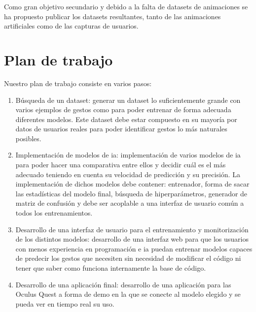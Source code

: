 Como gran objetivo secundario y debido a la falta de datasets de animaciones se ha propuesto publicar los datasets resultantes, tanto de las animaciones artificiales como de las capturas de usuarios.



\section{Plan de trabajo}
Nuestro plan de trabajo consiste en varios pasos:
\begin{enumerate}
	\item Búsqueda de un dataset: generar un dataset lo suficientemente grande con varios ejemplos de gestos como para poder entrenar de forma adecuada diferentes modelos. Este dataset debe estar compuesto en su mayoría por datos de usuarios reales para poder identificar gestos lo más naturales posibles.
	\item Implementación de modelos de \gls{ia}: implementación de varios modelos de \gls{ia} para poder hacer una comparativa entre ellos y decidir cuál es el más adecuado teniendo en cuenta su velocidad de predicción y su precisión. La implementación de dichos modelos debe contener: entrenador, forma de sacar las estadísticas del modelo final, búsqueda de hiperparámetros, generador de matriz de confusión y debe ser acoplable a una interfaz de usuario común a todos los entrenamientos.
	\item Desarrollo de una interfaz de usuario para el entrenamiento y monitorización de los distintos modelos: desarrollo de una interfaz web para que los usuarios con menos experiencia en programación e \gls{ia} puedan entrenar modelos capaces de predecir los gestos que necesiten sin necesidad de modificar el código ni tener que saber como funciona internamente la base de código.
	\item Desarrollo de una aplicación final: desarrollo de una aplicación para las Oculus Quest a forma de demo en la que se conecte al modelo elegido y se pueda ver en tiempo real su uso.
\end{enumerate}